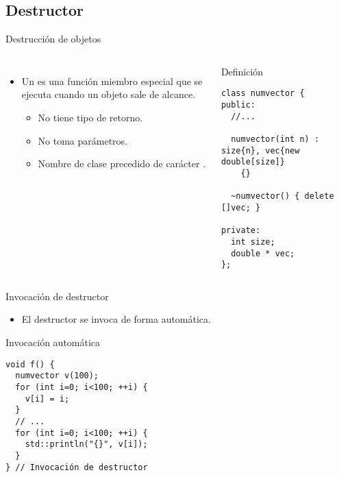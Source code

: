 \subsection{Destructor}

\begin{frame}[t,fragile]{Destrucción de objetos}
\begin{columns}[T]

\begin{itemize}
  \item Un  es una función miembro especial que se
        ejecuta  cuando un objeto sale de
        alcance.
    \begin{itemize}
      \item No tiene tipo de retorno.
      \item No toma parámetros.
      \item Nombre de clase precedido de carácter \textbf{\cppid{\~}}.
    \end{itemize}
\end{itemize}


\begin{block}{Definición}
\begin{lstlisting}
class numvector {
public:
  //...

  numvector(int n) : size{n}, vec{new double[size]}
    {}

  ~numvector() { delete []vec; }

private:
  int size;
  double * vec;
};
\end{lstlisting}
\end{block}

\end{columns}
\end{frame}

\begin{frame}[t,fragile]{Invocación de destructor}
\begin{itemize}
  \item El destructor se invoca de forma automática.
\end{itemize}

\begin{block}{Invocación automática}
\begin{lstlisting}
void f() {
  numvector v(100);
  for (int i=0; i<100; ++i) {
    v[i] = i;
  }
  // ...
  for (int i=0; i<100; ++i) {
    std::println("{}", v[i]);
  }
} // Invocación de destructor
\end{lstlisting}
\end{block}
\end{frame}
